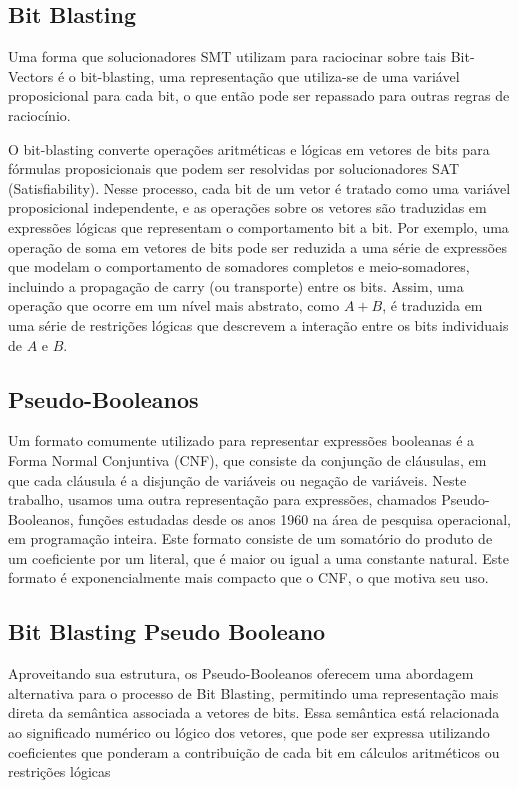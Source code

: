 \documentclass[conference]{IEEEtran}
\begin{document}
\subsection{Bit Blasting}
Uma forma que solucionadores SMT utilizam para raciocinar sobre tais Bit-Vectors é o bit-blasting,
uma representação que utiliza-se de uma variável proposicional para cada bit, o que então pode ser
repassado para outras regras de raciocínio.

O bit-blasting converte operações aritméticas e lógicas em vetores de bits para fórmulas
proposicionais que podem ser resolvidas por solucionadores SAT (Satisfiability). Nesse processo,
cada bit de um vetor é tratado como uma variável proposicional independente, e as operações sobre
os vetores são traduzidas em expressões lógicas que representam o comportamento bit a bit.
Por exemplo, uma operação de soma em vetores de bits pode ser reduzida a uma série de expressões que
modelam o comportamento de somadores completos e meio-somadores, incluindo a propagação de carry
(ou transporte) entre os bits. Assim, uma operação que ocorre em um nível mais abstrato, como
$A + B$, é traduzida em uma série de restrições lógicas que descrevem a interação entre os bits
individuais de $A$ e $B$.


\subsection{Pseudo-Booleanos}
Um formato comumente utilizado para representar expressões booleanas é a Forma Normal Conjuntiva (CNF), que
consiste da conjunção de cláusulas, em que cada cláusula é a disjunção de variáveis ou negação de variáveis\cite{CNF}.
Neste trabalho, usamos uma outra representação para expressões, chamados Pseudo-Booleanos, funções estudadas
desde os anos 1960 na área de pesquisa operacional, em programação inteira. Este formato consiste de um somatório
do produto de um coeficiente por um literal, que é maior ou igual a uma constante natural.
Este formato é exponencialmente mais compacto que o CNF, o que motiva seu uso\cite{PBSolve}.


\subsection{Bit Blasting Pseudo Booleano}
Aproveitando sua estrutura, os Pseudo-Booleanos oferecem uma abordagem alternativa para o
processo de Bit Blasting, permitindo uma representação mais direta da semântica
associada a vetores de bits. Essa semântica está relacionada ao significado numérico ou lógico
dos vetores, que pode ser expressa utilizando coeficientes que ponderam a contribuição de cada
bit em cálculos aritméticos ou restrições lógicas
\end{document}
